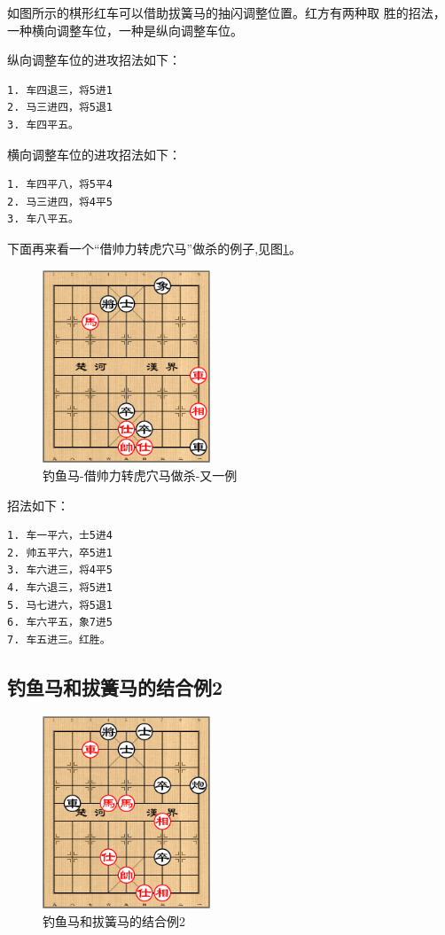 \documentclass[a5paper,twoside]{book}
\begin{document}
如图所示的棋形红车可以借助拔簧马的抽闪调整位置。红方有两种取
胜的招法，一种横向调整车位，一种是纵向调整车位。

纵向调整车位的进攻招法如下：
\begin{verbatim}
1. 车四退三，将5进1
2. 马三进四，将5退1
3. 车四平五。
\end{verbatim}

横向调整车位的进攻招法如下：
\begin{verbatim}
1. 车四平八，将5平4
2. 马三进四，将4平5
3. 车八平五。
\end{verbatim}

下面再来看一个“借帅力转虎穴马”做杀的例子,见图\ref{dym-jslzhxmzs-yyl}。

\begin{figure}[H]
\centering
\includegraphics[width=5cm]{pic/钓鱼马-借帅力转虎穴马做杀-又一例.png}
\caption{\label{dym-jslzhxmzs-yyl}钓鱼马-借帅力转虎穴马做杀-又一例}
\end{figure}

招法如下：

\begin{verbatim}
1. 车一平六，士5进4
2. 帅五平六，卒5进1
3. 车六进三，将4平5
4. 车六退三，将5进1
5. 马七进六，将5退1
6. 车六平五，象7进5
7. 车五进三。红胜。
\end{verbatim}

\subsection{钓鱼马和拔簧马的结合例2}
\label{sec-3-6-2}
\begin{figure}[H]
\centering
\includegraphics[width=5cm]{pic/钓鱼马和拔簧马的结合例2.png}
\caption{钓鱼马和拔簧马的结合例2}
\end{figure}
\end{document}
